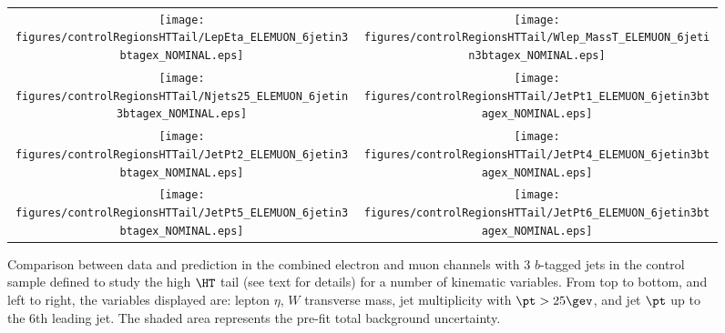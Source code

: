 \begin{figure}[htbp]
\begin{center}
\begin{tabular}{cc}
%
\texttt{[image: figures/controlRegionsHTTail/LepEta\_ELEMUON\_6jetin3btagex\_NOMINAL.eps]} &
\texttt{[image: figures/controlRegionsHTTail/Wlep\_MassT\_ELEMUON\_6jetin3btagex\_NOMINAL.eps]} \\
\texttt{[image: figures/controlRegionsHTTail/Njets25\_ELEMUON\_6jetin3btagex\_NOMINAL.eps]} &
\texttt{[image: figures/controlRegionsHTTail/JetPt1\_ELEMUON\_6jetin3btagex\_NOMINAL.eps]} \\
\texttt{[image: figures/controlRegionsHTTail/JetPt2\_ELEMUON\_6jetin3btagex\_NOMINAL.eps]} &
\texttt{[image: figures/controlRegionsHTTail/JetPt4\_ELEMUON\_6jetin3btagex\_NOMINAL.eps]} \\
\texttt{[image: figures/controlRegionsHTTail/JetPt5\_ELEMUON\_6jetin3btagex\_NOMINAL.eps]} &
\texttt{[image: figures/controlRegionsHTTail/JetPt6\_ELEMUON\_6jetin3btagex\_NOMINAL.eps]} \\
\end{tabular}\caption{\small {Comparison between data and prediction in the combined electron and muon channels with 3 $b$-tagged jets in the control sample
defined to study the high $\HT$ tail (see text for details)  for a number of kinematic
variables. From top to bottom, and left to right, the variables displayed are: lepton $\eta$, $W$ transverse mass, jet multiplicity with $\pt>25\gev$, 
and jet $\pt$ up to the 6th leading jet.
The shaded area represents the pre-fit total background uncertainty.}}
\label{fig:ELEMUON_controlHTTail_3btagex_2}
\end{center}
\end{figure}
